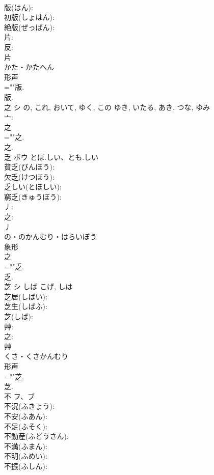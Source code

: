 \documentclass[8pt]{extreport}
\begin{document}
\begin{CJK}{UTF8}{min}
\\	版(はん): 
\\	初版(しょはん): 
\\	絶版(ぜっぱん): 
\\	片: 
\\	反: 
\\	片	
\\	かた・かたへん	
\\	形声 
\\	=""版.
\\	版.
\\	之	シ	の, これ, おいて, ゆく, この	ゆき, いたる, あき, つな, ゆみ	
\\	亠: 
\\	之
\\	=""之.
\\	之.
\\	乏	ボウ	とぼ.しい、とも.しい		
\\	貧乏(びんぼう): 
\\	欠乏(けつぼう): 
\\	乏しい(とぼしい): 
\\	窮乏(きゅうぼう): 
\\	丿: 
\\	之: 
\\	丿	
\\	の・のかんむり・はらいぼう	
\\	象形 
\\	之 
\\	=""乏.
\\	乏.
\\	芝	シ	しば	こげ, しは	
\\	芝居(しばい): 
\\	芝生(しばふ): 
\\	芝(しば): 
\\	艸: 
\\	之: 
\\	艸	
\\	くさ・くさかんむり	
\\	形声 
\\	=""芝.
\\	芝.
\\	不	フ、ブ			
\\	不況(ふきょう): 
\\	不安(ふあん): 
\\	不足(ふそく): 
\\	不動産(ふどうさん): 
\\	不満(ふまん): 
\\	不明(ふめい): 
\\	不振(ふしん): 

\end{CJK}
\end{document}
